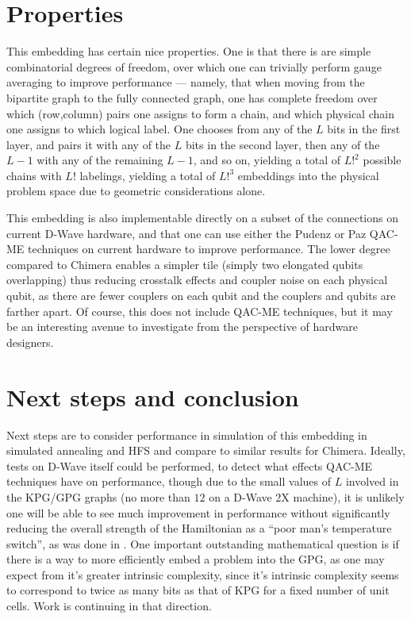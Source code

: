 \documentclass[superscriptaddress,showpacs,reprint]{revtex4-1}
\begin{document}
\section{Properties}

This embedding has certain nice properties. One is that there is are simple combinatorial degrees of freedom, over which one can trivially perform gauge averaging to improve performance --- namely, that when moving from the bipartite graph to the fully connected graph, one has complete freedom over which (row,column) pairs one assigns to form a chain, and which physical chain one assigns to which logical label. One chooses from any of the $L$ bits in the first layer, and pairs it with any of the $L$ bits in the second layer, then any of the $L-1$ with any of the remaining $L-1$, and so on, yielding a total of $L!^2$ possible chains with $L!$ labelings, yielding a total of $L!^3$ embeddings into the physical problem space due to geometric considerations alone. 

 This embedding is also implementable directly on a subset of the connections on current D-Wave hardware, and that one can use either the Pudenz or Paz QAC-ME techniques on current hardware to improve performance. The lower degree compared to Chimera enables a simpler tile (simply two elongated qubits overlapping) thus reducing crosstalk effects and coupler noise on each physical qubit, as there are fewer couplers on each qubit and the couplers and qubits are farther apart. Of course, this does not include QAC-ME techniques, but it may be an interesting avenue to investigate from the perspective of hardware designers.

\section{Next steps and conclusion}
Next steps are to consider performance in simulation of this embedding in simulated annealing and HFS and compare to similar results for Chimera. Ideally, tests on D-Wave itself could be performed, to detect what effects QAC-ME techniques have on performance, though due to the small values of $L$ involved in the KPG/GPG graphs (no more than $12$ on a D-Wave 2X machine), it is unlikely one will be able to see much improvement in performance without significantly reducing the overall strength of the Hamiltonian as a ``poor man's temperature switch'', as was done in  \cite{PAL:14,Vinci:2015um}. One important outstanding mathematical question is if there is a way to more efficiently embed a problem into the GPG, as one may expect from it's greater intrinsic complexity, since it's intrinsic complexity seems to correspond to twice as many bits as that of KPG for a fixed number of unit cells. Work is continuing in that direction.
\end{document}
